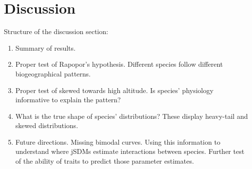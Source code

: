 \documentclass[11pt, a4paper]{article}
\begin{document}
\section*{Discussion}
Structure of the discussion section:
\begin{enumerate}
\item Summary of results.
\item Proper test of Rapopor's hypothesis. Different species follow different biogeographical patterns.
\item Proper test of skewed towards high altitude. Is species' physiology informative to explain the pattern? 
\item What is the true shape of species' distributions? These display heavy-tail and skewed distributions. 
\item Future directions. Missing bimodal curves. Using this information to understand where jSDMs estimate interactions between species. Further test of the ability of traits to predict those parameter estimates.
\end{enumerate}
% 



\clearpage

\end{document}
